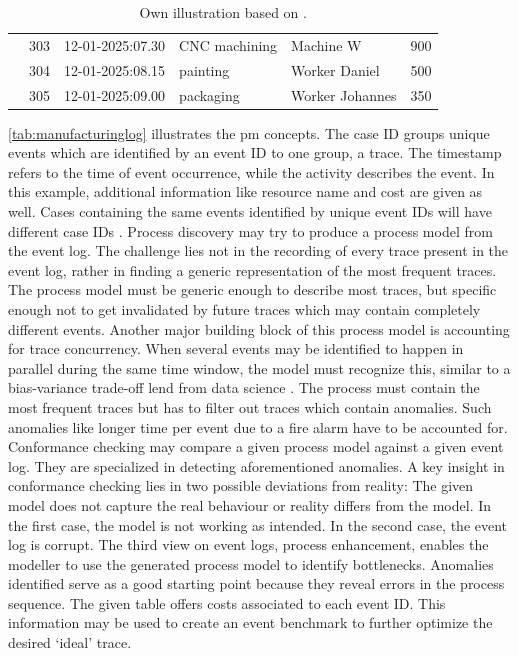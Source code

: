 \begin{table}[htbp]
{\begin{tabular}{r r l l l r}
                       & 303               & 12-01-2025:07.30   & CNC machining         & Machine W          & 900           \\
                       & 304               & 12-01-2025:08.15   & painting              & Worker Daniel      & 500           \\
                       & 305               & 12-01-2025:09.00   & packaging             & Worker Johannes    & 350           \\
      \bottomrule
    \end{tabular}%
  }
  \caption*{Own illustration based on \textcite{van2016data}.}
\end{table}

\autoref{tab:manufacturinglog} illustrates the \gls{pm} concepts. The case ID groups unique events which are identified by an event ID to one group, a trace. The timestamp refers to the time of event occurrence, while the activity describes the event. In this example, additional information like resource name and cost are given as well. Cases containing the same events identified by unique event IDs will have different case IDs \autocite{van2016data}. Process discovery may try to produce a process model from the event log. The challenge lies not in the recording of every trace present in the event log, rather in finding a generic representation of the most frequent traces. The process model must be generic enough to describe most traces, but specific enough not to get invalidated by future traces which may contain completely different events. Another major building block of this process model is accounting for trace concurrency. When several events may be identified to happen in parallel during the same time window, the model must recognize this, similar to a bias-variance trade-off lend from data science \autocite{briscoe2011conceptual}. The process must contain the most frequent traces but has to filter out traces which contain anomalies. Such anomalies like longer time per event due to a fire alarm have to be accounted for. Conformance checking may compare a given process model against a given event log. They are specialized in detecting aforementioned anomalies. A key insight in conformance checking lies in two possible deviations from reality: The given model does not capture the real behaviour or reality differs from the model. In the first case, the model is not working as intended. In the second case, the event log is corrupt. The third view on event logs, process enhancement, enables the modeller to use the generated process model to identify bottlenecks. Anomalies identified serve as a good starting point because they reveal errors in the process sequence. The given table offers costs associated to each event ID. This information may be used to create an event benchmark to further optimize the desired `ideal' trace.

